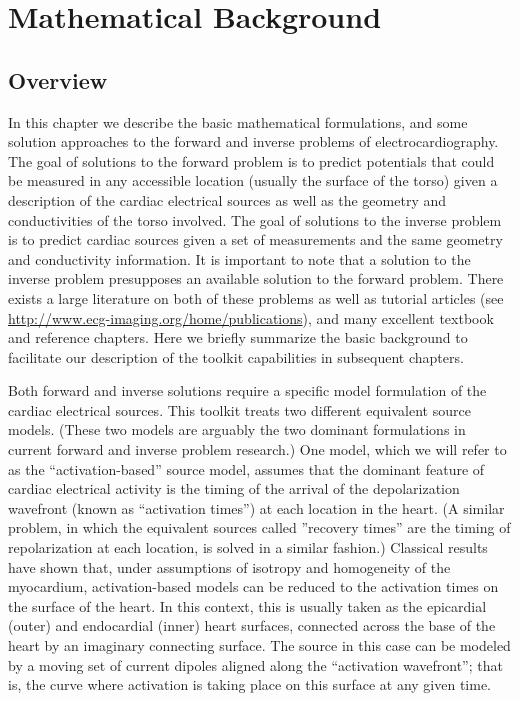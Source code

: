 \chapter{Mathematical Background} \label{sec:math}

\section{Overview}

In this chapter we describe the basic mathematical formulations, and some
solution approaches to the forward and inverse problems of
electrocardiography. The goal of solutions to the forward problem is to
predict potentials that could be measured in any accessible location
(usually the surface of the torso) given a description of the cardiac
electrical sources as well as the geometry and conductivities of the torso involved. The goal of
solutions to the inverse problem is to predict cardiac sources given a set
of measurements and the same geometry and conductivity information. It is
important to note that a solution to the inverse problem presupposes an
available solution to the forward problem. There exists a large literature on
both of these problems as well as tutorial articles 
(see \url{http://www.ecg-imaging.org/home/publications}),  and many excellent textbook
and reference chapters. Here we briefly summarize the
basic background to facilitate our description of the toolkit capabilities
in subsequent chapters.

Both forward and inverse solutions require a specific model formulation of
the cardiac electrical sources. This toolkit treats two different
equivalent source models. (These two models are arguably the two dominant
formulations in current forward and inverse problem research.) One model,
which we will refer to as the ``activation-based'' source model, assumes
that the dominant feature of cardiac electrical activity is the timing of
the arrival of the depolarization wavefront (known as ``activation times'')
at each location in the heart. (A similar problem, in which the equivalent 
sources called ''recovery times'' are the timing of repolarization at each 
location, is solved in a similar fashion.) Classical
results have shown that, under assumptions of isotropy and homogeneity of
the myocardium, activation-based models can be reduced to the activation
times on the surface of the heart. In this context, this is usually taken as
the epicardial (outer) and endocardial (inner) heart surfaces, connected
across the base of the heart by an imaginary connecting surface. The source
in this case can be modeled by a moving set of current dipoles aligned
along the ``activation wavefront''; that is, the curve where activation is
taking place on this surface at any given time.

